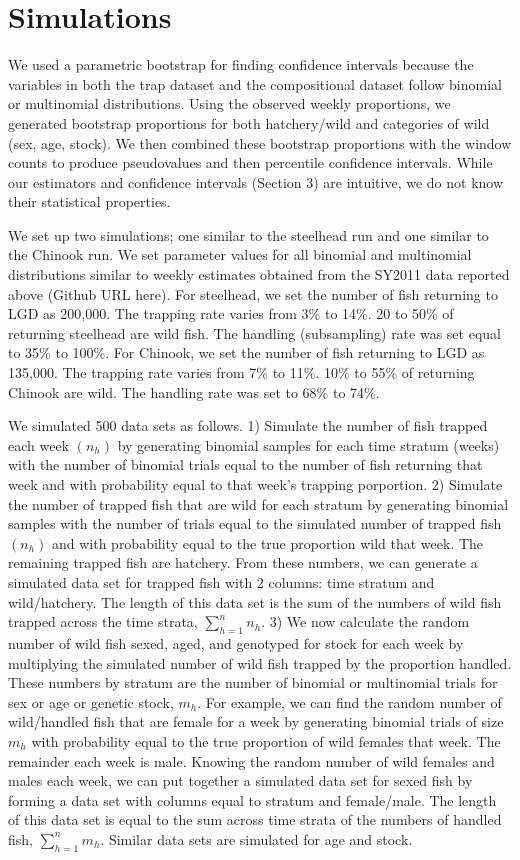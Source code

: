 \documentclass[12pt]{article}
\begin{document}
\section{Simulations}

We used a parametric bootstrap for finding confidence intervals because the variables in both the trap dataset and the compositional dataset follow binomial or multinomial distributions. Using the observed weekly proportions, we generated bootstrap proportions for both  hatchery/wild and categories of wild (sex, age, stock). We then combined these bootstrap proportions with the window counts to produce pseudovalues and then percentile confidence intervals. While our estimators and confidence intervals (Section 3) are intuitive, we do not know their statistical properties.

We set up two simulations; one similar to the steelhead run and one similar to the Chinook run. We set parameter values for all binomial and multinomial distributions similar to weekly estimates obtained from the SY2011 data reported above (Github URL here). For steelhead, we set the number of fish returning to LGD as 200,000. The trapping rate varies from 3\% to 14\%. 20 to 50\% of returning steelhead are wild fish. The handling (subsampling) rate was set equal to 35\% to 100\%. For Chinook, we set the number of fish returning to LGD as 135,000. The trapping rate varies from 7\% to 11\%. 10\% to 55\% of returning Chinook are wild. The handling rate was set to 68\% to 74\%.

We simulated 500 data sets as follows. 1) Simulate the number of fish trapped each week $(n_h)$ by generating binomial samples for each time stratum (weeks) with the number of binomial trials equal to the number of fish returning that week and with probability equal to that week's trapping porportion. 2) Simulate the number of trapped fish that are wild for each stratum by generating binomial samples with the number of trials equal to the simulated number of trapped fish $(n_h)$ and with probability equal to the true proportion wild that week. The remaining trapped fish are hatchery. From these numbers, we can generate a simulated data set for trapped fish with 2 columns: time stratum and wild/hatchery. The length of this data set is the sum of the numbers of wild fish trapped across the time strata, \(\sum\limits_{h=1}^{n} n_h\). 3) We now calculate the random number of wild fish sexed, aged, and genotyped for stock for each week by multiplying the simulated number of wild fish trapped by the proportion handled. These numbers by stratum are the number of binomial or multinomial trials for sex or age or genetic stock, \(m_h\). For example, we can find the random number of wild/handled fish that are female for a week by generating binomial trials of size \(m_h\) with probability equal to the true proportion of wild females that week. The remainder each week is male. Knowing the random number of wild females and males each week, we can put together a simulated data set for sexed fish by forming a data set with columns equal to stratum and female/male. The length of this data set is equal to the sum across time strata of the numbers of handled fish,  \(\sum\limits_{h=1}^{n} m_h\). Similar data sets are simulated for age and stock.
\end{document}
